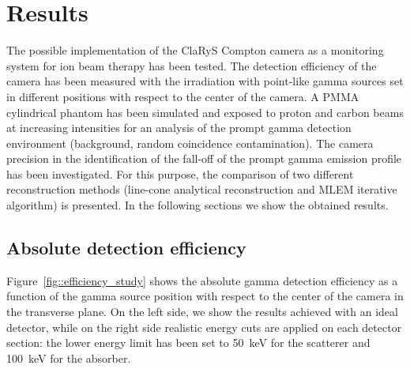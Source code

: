 \section{Results}

The possible implementation of the ClaRyS Compton camera as a monitoring system for ion beam therapy has been tested. The detection efficiency of the camera has been measured with the irradiation with point-like gamma sources set in different positions with respect to the center of the camera. A PMMA cylindrical phantom has been simulated and exposed to proton and carbon beams at increasing intensities for an analysis of the prompt gamma detection environment (background, random coincidence contamination). The camera precision in the identification of the fall-off of the prompt gamma emission profile has been investigated. For this purpose, the comparison of two different reconstruction methods (line-cone analytical reconstruction and MLEM iterative algorithm) is presented. In the following sections we show the obtained results. 


\subsection{Absolute detection efficiency}
\label{Results::efficiency}

Figure~\ref{fig::efficiency_study} shows the absolute gamma detection efficiency as a function of the gamma source position with respect to the center of the camera in the transverse plane. On the left side, we show the results achieved with an ideal detector, while on the right side realistic energy cuts are applied on each detector section: the lower energy limit  has been set to 50~keV for the scatterer and 100~keV for the absorber.


